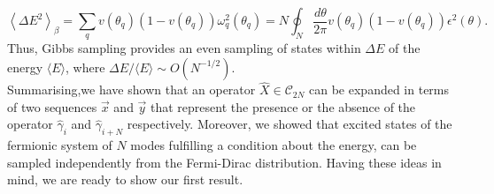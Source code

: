 \begin{equation}
\left\langle\Delta E^{2}\right\rangle_{\beta}=\sum_{q} v\left(\theta_{q}\right)\left(1 - v\left(\theta_{q}\right)\right) \omega_{q}^{2}\left(\theta_{q}\right)=N \oint_{N} \frac{d \theta}{2 \pi} v\left(\theta_{q}\right)\left(1 - v\left(\theta_{q}\right)\right) \epsilon^{2}(\theta).
\end{equation}
Thus, Gibbs sampling provides an even sampling of states within $\Delta E$ of the energy $\langle E\rangle$, where $\Delta E/\langle E\rangle\sim O(N^{-1/2})$.\\

\indent Summarising,we have shown that an operator $\hat{X}\in \mathcal{C}_{2N}$ can be expanded in terms of two sequences $\vec{x}$ and $\vec{y}$ that represent the presence or the absence of the operator $\hat{\gamma}_i$ and $\hat{\gamma}_{i+N}$ respectively. Moreover, we showed that excited states of the fermionic system of $N$ modes fulfilling a condition about the energy, can be sampled independently from the Fermi-Dirac distribution. Having these ideas in mind, we are ready to show our first result.
